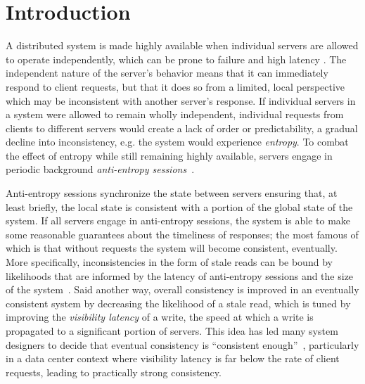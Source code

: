 \section*{Introduction}

A distributed system is made highly available when individual servers are
allowed to operate independently,
which can be prone to failure and high latency .
The independent nature of the server's behavior means that it can immediately
respond to client requests, but that it does so from a limited, local
perspective which may be inconsistent with another server's response.
If individual servers in a system were allowed to remain wholly independent,
individual requests from clients to different servers would create a lack of
order or predictability, a gradual decline into inconsistency, e.g. the
system would experience \textit{entropy}.
To combat the effect of entropy while still remaining highly available,
servers engage in periodic background \textit{anti-entropy
  sessions}~\cite{terry_session_1994}.

Anti-entropy sessions synchronize the state between servers ensuring that,
at least briefly, the local state is consistent with a portion of the global
state of the system.
If all servers engage in anti-entropy sessions, the system is able to make
some reasonable guarantees about the timeliness of responses; the most famous
of which is that without requests the system will become
consistent, eventually.
More specifically, inconsistencies in the form of stale reads can be bound by
likelihoods that are informed by the latency of anti-entropy sessions and the
size of the system~\cite{bailis_quantifying_2014}.
Said another way, overall consistency is improved in an eventually consistent
system by decreasing the likelihood of a stale read, which is tuned by
improving the \textit{visibility latency} of a write, the speed at which a
write is propagated to a significant portion of servers.
This idea has led many system designers to decide that eventual consistency
is ``consistent enough''~\cite{bermbach_eventual_2011,wada_data_2011},
particularly in a data center context where visibility latency is far below
the rate of client requests, leading to practically strong consistency.

